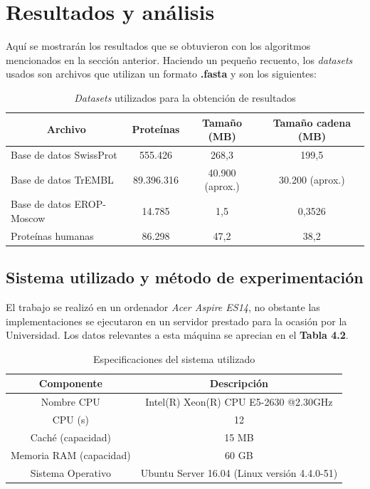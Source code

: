\chapter{Resultados y análisis}

Aquí se mostrarán los resultados que se obtuvieron con los algoritmos mencionados en la sección anterior. Haciendo un pequeño recuento, los \textit{datasets} usados son archivos que utilizan un formato \textbf{.fasta} y son los siguientes:

\begin{table}[h]
\centering
\begin{tabular}{|l|c|c|c|}
\hline
\multicolumn{1}{|c|}{\textbf{Archivo}} & \textbf{Proteínas} & \textbf{Tamaño (MB)} & \textbf{Tamaño cadena (MB)} \\ \hline
Base de datos SwissProt    & 555.426                & 268,3                & 199,5              \\
Base de datos TrEMBL        & 89.396.316              & 40.900 (aprox.)       & 30.200 (aprox.)     \\
Base de datos EROP-Moscow        & 14.785                 & 1,5                  & 0,3526                \\
Proteínas humanas     & 86.298                 & 47,2                 & 38,2               \\ \hline
\end{tabular}
\caption{\textit{Datasets} utilizados para la obtención de resultados}
\label{tb:labelr1}
\end{table} 

\section{Sistema utilizado y método de experimentación}

El trabajo se realizó en un ordenador \textit{Acer Aspire ES14}, no obstante las implementaciones se ejecutaron en un servidor prestado para la ocasión por la Universidad. Los datos relevantes a esta máquina se aprecian en el \textbf{Tabla 4.2}.

\begin{table}[h]
\centering
\begin{tabular}{|c|c|}
\hline
\textbf{Componente}     & \textbf{Descripción}                         \\ \hline
Nombre CPU              & Intel(R) Xeon(R) CPU E5-2630 @2.30GHz        \\
CPU (s)                 & 12                                           \\
Caché (capacidad)       & 15 MB                                        \\
Memoria RAM (capacidad) & 60 GB                                        \\
Sistema Operativo       & Ubuntu Server 16.04 (Linux versión 4.4.0-51) \\ \hline
\end{tabular}
\caption{Especificaciones del sistema utilizado}
\label{tb:labelr2}
\end{table}

